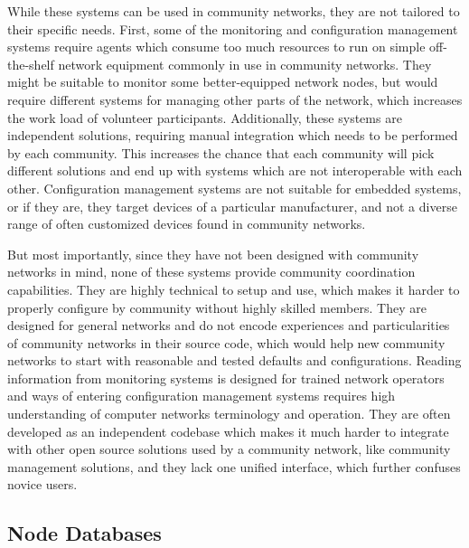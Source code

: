 \documentclass[5p,sort&compress]{elsarticle}
\begin{document}
While these systems can be used in community networks, they are not tailored to their specific needs.
First, some of the monitoring and configuration management systems require agents which consume too much resources to run on simple off-the-shelf network equipment commonly in use in community networks.
They might be suitable to monitor some better-equipped network nodes, but would require different systems for managing other parts of the network, which increases the work load of volunteer participants.
Additionally, these systems are independent solutions, requiring manual integration which needs to be performed by each community.
This increases the chance that each community will pick different solutions and end up with systems which are not interoperable with each other.
Configuration management systems are not suitable for embedded systems, or if they are, they target devices of a particular manufacturer, and not a diverse range of often customized devices found in community networks.

But most importantly, since they have not been designed with community networks in mind, none of these systems provide community coordination capabilities.
They are highly technical to setup and use, which makes it harder to properly configure by community without highly skilled members.
They are designed for general networks and do not encode experiences and particularities of community networks in their source code, which would help new community networks to start with reasonable and tested defaults and configurations.
Reading information from monitoring systems is designed for trained network operators and ways of entering configuration management systems requires high understanding of computer networks terminology and operation.
They are often developed as an independent codebase which makes it much harder to integrate with other open source solutions used by a community network, like community management solutions, and they lack one unified interface, which further confuses novice users.

\subsection{Node Databases}
\end{document}
